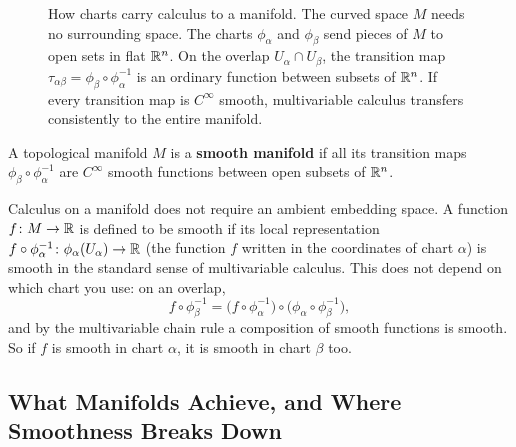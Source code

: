\begin{figure}[htbp]
\caption{How charts carry calculus to a manifold. The curved space $M$ needs no surrounding space. The charts $\phi_\alpha$ and $\phi_\beta$ send pieces of $M$ to open sets in flat $\mathbb{R}^n$. On the overlap $U_\alpha \cap U_\beta$, the transition map $\tau_{\alpha\beta} = \phi_\beta \circ \phi_\alpha^{-1}$ is an ordinary function between subsets of $\mathbb{R}^n$. If every transition map is $C^\infty$ smooth, multivariable calculus transfers consistently to the entire manifold.}\label{geom:fig-transition-map}
\end{figure}

\begin{formalbox}
A topological manifold $M$ is a \textbf{smooth manifold} if all its transition maps $\phi_\beta \circ \phi_\alpha^{-1}$ are $C^\infty$ smooth functions between open subsets of $\mathbb{R}^n$.
\end{formalbox}

Calculus on a manifold does not require an ambient embedding space. A function $f \colon M \to \mathbb{R}$ is defined to be smooth if its local representation $f \circ \phi_\alpha^{-1} \colon \phi_\alpha(U_\alpha) \to \mathbb{R}$ (the function $f$ written in the coordinates of chart $\alpha$) is smooth in the standard sense of multivariable calculus. This does not depend on which chart you use: on an overlap,
\[
f \circ \phi_\beta^{-1} = \bigl(f \circ \phi_\alpha^{-1}\bigr) \circ \bigl(\phi_\alpha \circ \phi_\beta^{-1}\bigr),
\]
and by the multivariable chain rule a composition of smooth functions is smooth. So if $f$ is smooth in chart $\alpha$, it is smooth in chart $\beta$ too.

\subsection{What Manifolds Achieve, and Where Smoothness Breaks Down}

